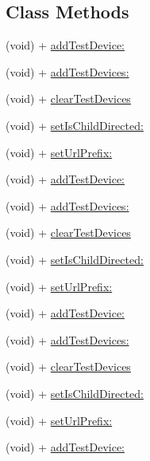 \subsection*{Class Methods}
\begin{DoxyCompactItemize}
\item 
(void) + \hyperlink{interfaceFBAdSettings_adf2fc44110adb3613551750bf42671af}{add\+Test\+Device\+:}
\item 
(void) + \hyperlink{interfaceFBAdSettings_aef0e9decab562f63ecadc72dbb594a56}{add\+Test\+Devices\+:}
\item 
(void) + \hyperlink{interfaceFBAdSettings_af6d62d5a096e6701bb83407114eb7dd6}{clear\+Test\+Devices}
\item 
(void) + \hyperlink{interfaceFBAdSettings_a0f1e7129f1c07b5420d9a6a1f7eb9768}{set\+Is\+Child\+Directed\+:}
\item 
(void) + \hyperlink{interfaceFBAdSettings_aab1304a0308648520b5dc1fda60a944c}{set\+Url\+Prefix\+:}
\item 
(void) + \hyperlink{interfaceFBAdSettings_adf2fc44110adb3613551750bf42671af}{add\+Test\+Device\+:}
\item 
(void) + \hyperlink{interfaceFBAdSettings_aef0e9decab562f63ecadc72dbb594a56}{add\+Test\+Devices\+:}
\item 
(void) + \hyperlink{interfaceFBAdSettings_af6d62d5a096e6701bb83407114eb7dd6}{clear\+Test\+Devices}
\item 
(void) + \hyperlink{interfaceFBAdSettings_a0f1e7129f1c07b5420d9a6a1f7eb9768}{set\+Is\+Child\+Directed\+:}
\item 
(void) + \hyperlink{interfaceFBAdSettings_aab1304a0308648520b5dc1fda60a944c}{set\+Url\+Prefix\+:}
\item 
(void) + \hyperlink{interfaceFBAdSettings_adf2fc44110adb3613551750bf42671af}{add\+Test\+Device\+:}
\item 
(void) + \hyperlink{interfaceFBAdSettings_aef0e9decab562f63ecadc72dbb594a56}{add\+Test\+Devices\+:}
\item 
(void) + \hyperlink{interfaceFBAdSettings_af6d62d5a096e6701bb83407114eb7dd6}{clear\+Test\+Devices}
\item 
(void) + \hyperlink{interfaceFBAdSettings_a0f1e7129f1c07b5420d9a6a1f7eb9768}{set\+Is\+Child\+Directed\+:}
\item 
(void) + \hyperlink{interfaceFBAdSettings_aab1304a0308648520b5dc1fda60a944c}{set\+Url\+Prefix\+:}
\item 
(void) + \hyperlink{interfaceFBAdSettings_adf2fc44110adb3613551750bf42671af}{add\+Test\+Device\+:}

\end{DoxyCompactItemize}
